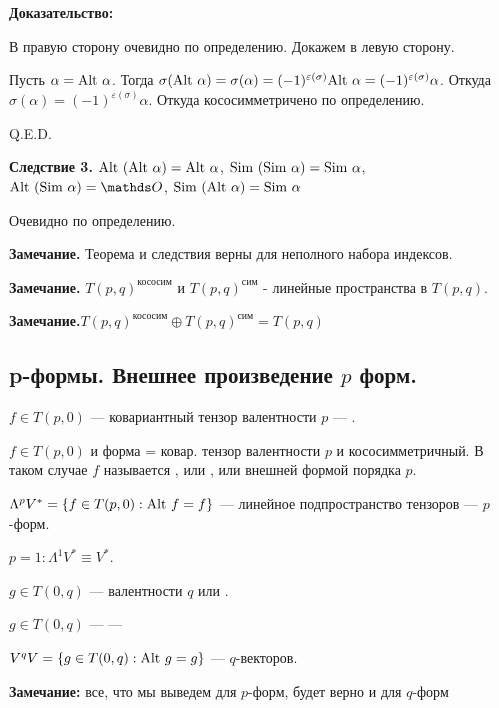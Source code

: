 \textbf{Доказательство:}

В правую сторону очевидно по определению. Докажем в левую сторону.

Пусть $\alpha = \text{Alt } \alpha$. Тогда $\sigma(\text{Alt } \alpha) = \sigma(\alpha) = (-1)^{\varepsilon(\sigma)}\text{Alt } \alpha = (-1)^{\varepsilon(\sigma)}\alpha$. Откуда $\sigma(\alpha) = (-1)^{\varepsilon(\sigma)} \alpha$. Откуда кососимметричено по определению.

\hfill Q.E.D.

\textbf{Следствие 3.} $\text{Alt }(\text{Alt } \alpha) = \text{Alt } \alpha$, $\text{Sim }(\text{Sim } \alpha) = \text{Sim } \alpha$, $\Alt(\Sim \alpha) = \zero$, $\text{Sim }(\text{Alt } \alpha) = \text{Sim } \alpha$

Очевидно по определению.

\textbf{Замечание.} Теорема и следствия верны для неполного набора индексов.

\textbf{Замечание.} $T(p,q)^{\text{кососим}}$ и  $T(p,q)^{\text{сим}}$ - линейные пространства в $T(p,q)$.

\textbf{Замечание.}$T(p,q)^{\text{кососим}} \oplus T(p,q)^{\text{сим}} = T(p,q)$

\pagebreak

\subsection{p-формы. Внешнее произведение $p$ форм.}

 $f \in T(p,0)$ --- ковариантный тензор валентности $p$ --- .

$f \in T(p,0)$ и  форма = ковар. тензор валентности $p$ и кососимметричный. В таком случае $f$ называется , или , или внешней формой порядка $p$. 

$\Lambda^pV^* = \{f \in T(p,0): \text{Alt } f = f\}$ --- линейное подпространство тензоров ---  $p$-форм.

$p = 1: \Lambda^1 V^* \equiv V^*$.

 $g\in T(0,q)$ ---  валентности $q$ или .

$g \in T(0,q)$ ---  --- 

$V^qV = \{g\in T(0,q): \text{Alt } g =g\}$ ---  $q$-векторов.

\textbf{Замечание:} все, что мы выведем для $p$-форм, будет верно и для $q$-форм

